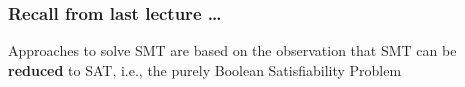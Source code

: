 \begin{frame}
  \frametitle{Recall from last lecture \ldots}

  Approaches to solve SMT \formulae are based on the observation
  that SMT can be {\bf reduced} to SAT, i.e., the purely Boolean
  Satisfiability Problem
  \vfill
  \pause
  \begin{center}
    \scalebox{.5}{}
  \end{center}

\end{frame}
